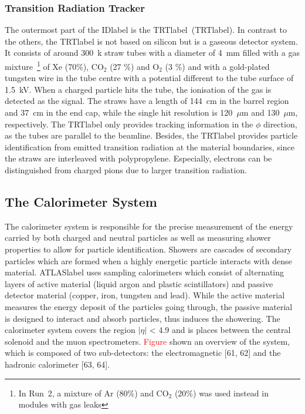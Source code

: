 \subsubsection*{Transition Radiation Tracker}

The outermost part of the \acrshort{IDlabel} is the \acrlong{TRTlabel}~(\acrshort{TRTlabel}). In contrast to the others, the \acrshort{TRTlabel} is not based on silicon but is a gaseous detector system. It consists of around 300~k straw tubes with a diameter of 4~mm filled with a gas mixture~\footnote{In Run~2, a mixture of Ar (80\%) and CO$_2$ (20\%) was used instead in modules with gas leaks} of Xe (70\%), CO$_2$ (27 \%) and O$_2$ (3 \%) and with a gold-plated tungsten wire in the tube centre with a potential different to the tube surface of 1.5~kV. When a charged particle hits the tube, the ionisation of the gas is detected as the signal. The straws have a length of 144~cm in the barrel region and 37~cm in the end cap, while the single hit resolution is 120~$\mu$m and 130~$\mu$m, respectively. The \acrshort{TRTlabel} only provides tracking information in the $\phi$ direction, as the tubes are parallel to the beamline. Besides, the \acrshort{TRTlabel} provides particle identification from emitted transition radiation at the material boundaries, since the straws are interleaved with polypropylene. Especially, electrons can be distinguished from charged pions due to larger transition radiation.


\subsection{The Calorimeter System}

The calorimeter system is responsible for the precise measurement of the energy carried by both charged and neutral particles as well as measuring shower properties to allow for particle identification. Showers are cascades of secondary particles which are formed when a highly energetic particle interacts with dense material. \acrshort{ATLASlabel} uses sampling calorimeters which consist of alternating layers of active material (liquid argon and plastic scintillators) and passive detector material (copper, iron, tungsten and lead). While the active material measures the energy deposit of the particles going through, the passive material is designed to interact and absorb particles, thus induces the showering. The calorimeter system covers the region $|\eta|$ < 4.9 and is places between the central solenoid and the muon spectrometers. \textcolor{red}{Figure} shown an overview of the system, which is composed of two sub-detectors: the electromagnetic [61, 62] and the hadronic calorimeter [63, 64]. 

